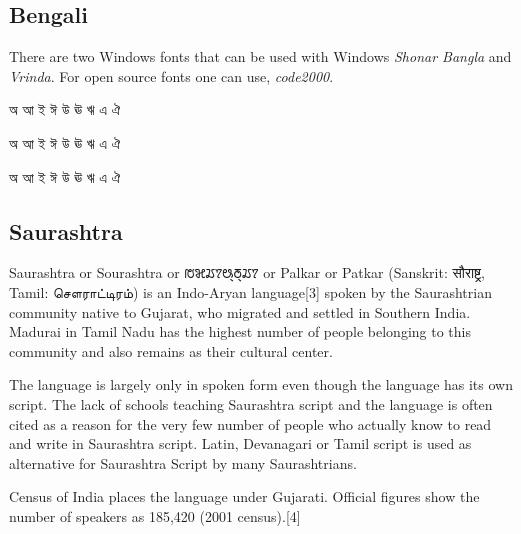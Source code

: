 \subsection{Bengali}

There are two Windows fonts that can be used with Windows \textit{Shonar Bangla} and \textit{Vrinda}. For open source fonts one can use, \textit{code2000}.
\bigskip

\bgroup
\newfontfamily{}


\bengali
\centering

  অ  আ ই  ঈ  উ  ঊ  ঋ  এ  ঐ\par


\centering

  অ  আ ই  ঈ  উ  ঊ  ঋ  এ  ঐ\par



\centering

  অ  আ ই  ঈ  উ  ঊ  ঋ  এ  ঐ\par

\egroup

\subsection{Saurashtra}

\newfontfamily{}

Saurashtra or Sourashtra or {\saurashtra ꢱꣃꢬꢵꢰ꣄ꢜ꣄ꢬꢵ} or Palkar or Patkar (Sanskrit: सौराष्ट्र, Tamil: சௌராட்டிரம்) is an Indo-Aryan language[3] spoken by the Saurashtrian community native to Gujarat, who migrated and settled in Southern India. Madurai in Tamil Nadu has the highest number of people belonging to this community and also remains as their cultural center.

The language is largely only in spoken form even though the language has its own script. The lack of schools teaching Saurashtra script and the language is often cited as a reason for the very few number of people who actually know to read and write in Saurashtra script. Latin, Devanagari or Tamil script is used as alternative for Saurashtra Script by many Saurashtrians.

Census of India places the language under Gujarati. Official figures show the number of speakers as 185,420 (2001 census).[4]



